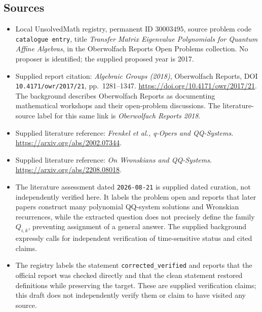 \documentclass[11pt]{article}
\begin{document}
\subsection{Sources}
\begin{itemize}
\item Local UnsolvedMath registry, permanent ID \(30003495\), source problem code \texttt{catalogue entry}, title \emph{Transfer Matrix Eigenvalue Polynomials for Quantum Affine Algebras}, in the Oberwolfach Reports Open Problems collection. No proposer is identified; the supplied proposed year is 2017.
\item Supplied report citation: \emph{Algebraic Groups (2018)}, Oberwolfach Reports, DOI \texttt{10.4171/owr/2017/21}, pp.\ 1281--1347. \url{https://doi.org/10.4171/owr/2017/21}. The background describes Oberwolfach Reports as documenting mathematical workshops and their open-problem discussions. The literature-source label for this same link is \emph{Oberwolfach Reports 2018}.
\item Supplied literature reference: \emph{Frenkel et al., q-Opers and QQ-Systems}. \url{https://arxiv.org/abs/2002.07344}.
\item Supplied literature reference: \emph{On Wronskians and QQ-Systems}. \url{https://arxiv.org/abs/2208.08018}.
\item The literature assessment dated \texttt{2026-08-21} is supplied dated curation, not independently verified here. It labels the problem open and reports that later papers construct many polynomial QQ-system solutions and Wronskian recurrences, while the extracted question does not precisely define the family \(Q_{i,k}\), preventing assignment of a general answer. The supplied background expressly calls for independent verification of time-sensitive status and cited claims.
\item The registry labels the statement \texttt{corrected\_verified} and reports that the official report was checked directly and that the clean statement restored definitions while preserving the target. These are supplied verification claims; this draft does not independently verify them or claim to have visited any source.
\end{itemize}
\end{document}
